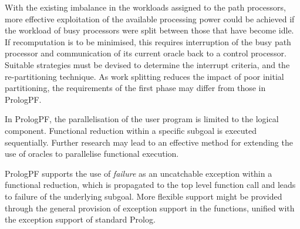 With the existing imbalance in the workloads assigned to the path processors, more
effective exploitation of the available processing power could be achieved if
the workload of busy processors were split between those that have become idle.
If recomputation is to be minimised, this requires interruption of the busy
path processor and communication of its current oracle back to a control processor.
Suitable strategies must be devised to determine the interrupt criteria,
and the re-partitioning technique.  As work splitting reduces the impact of poor
initial partitioning, the requirements of the first phase may differ from those in
PrologPF.

In PrologPF, the parallelisation of the user program is limited to the 
logical component.  Functional reduction within a specific subgoal is executed
sequentially.  Further research may lead to an effective method for extending the
use of oracles to parallelise functional execution.

PrologPF supports the use of \textit{failure} as an uncatchable exception within
a functional reduction, which is propagated to the top level function call and
leads to failure of the underlying subgoal.  More flexible support might be
provided through the general provision of exception support in the functions,
unified with the exception support of standard Prolog.






